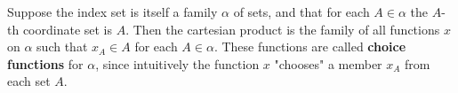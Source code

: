 Suppose the index set is itself a family $\alpha$ of sets, and that for each $A \in \alpha$ the $A$-th coordinate set is $A$. Then the cartesian product is the family of all functions $x$ on $\alpha$ such that $x_A \in A$ for each $A \in \alpha$. These functions are called \textbf{choice functions} for $\alpha$, since intuitively the function $x$ "chooses" a member $x_A$ from each set $A$.
